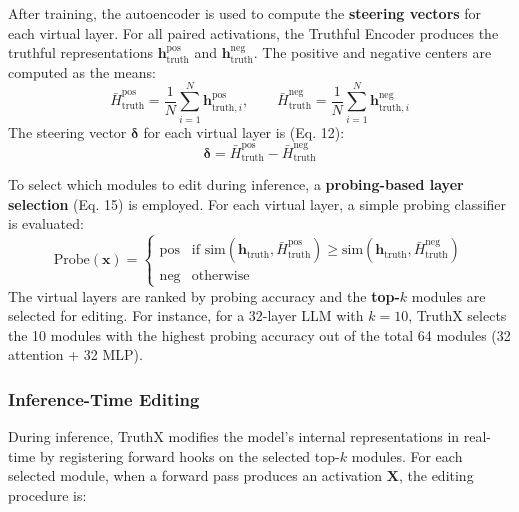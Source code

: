After training, the autoencoder is used to compute the \textbf{steering vectors} for each virtual layer. For all paired activations, the Truthful Encoder produces the truthful representations $\mathbf{h}_{\mathrm{truth}}^{\mathrm{pos}}$ and $\mathbf{h}_{\mathrm{truth}}^{\mathrm{neg}}$. The positive and negative centers are computed as the means:
\begin{equation}
\label{eq:truth_centers}
\bar{H}_{\mathrm{truth}}^{\mathrm{pos}} = \frac{1}{N} \sum_{i=1}^{N} \mathbf{h}_{\mathrm{truth},i}^{\mathrm{pos}}, \qquad \bar{H}_{\mathrm{truth}}^{\mathrm{neg}} = \frac{1}{N} \sum_{i=1}^{N} \mathbf{h}_{\mathrm{truth},i}^{\mathrm{neg}}
\end{equation}
The steering vector $\boldsymbol{\delta}$ for each virtual layer is (Eq. 12):
\begin{equation}
\label{eq:steering_vector}
\boldsymbol{\delta} = \bar{H}_{\mathrm{truth}}^{\mathrm{pos}} - \bar{H}_{\mathrm{truth}}^{\mathrm{neg}}
\end{equation}

To select which modules to edit during inference, a \textbf{probing-based layer selection} (Eq. 15) is employed. For each virtual layer, a simple probing classifier is evaluated:
\begin{equation}
\label{eq:probing_classifier}
\mathrm{Probe}(\mathbf{x}) = \begin{cases} \mathrm{pos} & \text{if } \mathrm{sim}(\mathbf{h}_{\mathrm{truth}}, \bar{H}_{\mathrm{truth}}^{\mathrm{pos}}) \ge \mathrm{sim}(\mathbf{h}_{\mathrm{truth}}, \bar{H}_{\mathrm{truth}}^{\mathrm{neg}}) \\ \mathrm{neg} & \text{otherwise} \end{cases}
\end{equation}
The virtual layers are ranked by probing accuracy and the \textbf{top-$k$} modules are selected for editing. For instance, for a 32-layer LLM with $k=10$, TruthX selects the 10 modules with the highest probing accuracy out of the total 64 modules (32 attention + 32 MLP).


\subsubsection{Inference-Time Editing}
\label{sec:truthx-inference}

During inference, TruthX modifies the model's internal representations in real-time by registering forward hooks on the selected top-$k$ modules. For each selected module, when a forward pass produces an activation $\mathbf{X}$, the editing procedure is:

